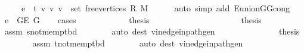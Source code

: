\begin{isabellebody}
\ \ \ \ {\isacharparenleft}{\kern0pt}{}{\isacharparenright}{\kern0pt}\ {\isachardoublequoteopen}e\ {\isasymin}\ {\isacharbraceleft}{\kern0pt}{\isacharbraceleft}{\kern0pt}t{\isacharcomma}{\kern0pt}\ v{\isacharbraceright}{\kern0pt}\ {\isacharbar}{\kern0pt}v{\isachardot}{\kern0pt}\ v\ {\isasymin}\ set\ {\isacharparenleft}{\kern0pt}free{\isacharunderscore}{\kern0pt}vertices\ R\ M{\isacharparenright}{\kern0pt}{\isacharbraceright}{\kern0pt}{\isachardoublequoteclose}\isanewline
\ \ \ \ \isamarkupfalse%
\ {\isacharparenleft}{\kern0pt}auto\ simp\ add{\isacharcolon}{\kern0pt}\ E{\isacharunderscore}{\kern0pt}union{\isacharunderscore}{\kern0pt}G{}{\isacharunderscore}{\kern0pt}G{}{\isacharunderscore}{\kern0pt}cong{\isacharparenright}{\kern0pt}\isanewline
\ \ \isamarkupfalse%
\ {\isachardoublequoteopen}e\ {\isasymin}\ G{\isachardot}{\kern0pt}E\ G{\isachardoublequoteclose}\isanewline
\ \ \isamarkupfalse%
\ {\isacharparenleft}{\kern0pt}cases{\isacharparenright}{\kern0pt}\isanewline
\ \ \ \ \isamarkupfalse%
\ {}\isanewline
\ \ \ \ \isamarkupfalse%
\ {\isacharquery}{\kern0pt}thesis\isanewline
\ \ \ \ \ \ \isacommand{{\isachardot}{\kern0pt}}\isamarkupfalse%
\isanewline
\ \ \isamarkupfalse%
\isanewline
\ \ \ \ \isamarkupfalse%
\ {}\isanewline
\ \ \ \ \isamarkupfalse%
\ {\isacharquery}{\kern0pt}thesis\isanewline
\ \ \ \ \ \ \isamarkupfalse%
\ assm\ s{\isacharunderscore}{\kern0pt}not{\isacharunderscore}{\kern0pt}mem{\isacharunderscore}{\kern0pt}p{\isacharunderscore}{\kern0pt}tbd\isanewline
\ \ \ \ \ \ \isamarkupfalse%
\ {\isacharparenleft}{\kern0pt}auto\ dest{\isacharcolon}{\kern0pt}\ v{\isacharunderscore}{\kern0pt}in{\isacharunderscore}{\kern0pt}edge{\isacharunderscore}{\kern0pt}in{\isacharunderscore}{\kern0pt}path{\isacharunderscore}{\kern0pt}gen{\isacharparenright}{\kern0pt}\isanewline
\ \ \isamarkupfalse%
\isanewline
\ \ \ \ \isamarkupfalse%
\ {}\isanewline
\ \ \ \ \isamarkupfalse%
\ {\isacharquery}{\kern0pt}thesis\isanewline
\ \ \ \ \ \ \isamarkupfalse%
\ assm\ t{\isacharunderscore}{\kern0pt}not{\isacharunderscore}{\kern0pt}mem{\isacharunderscore}{\kern0pt}p{\isacharunderscore}{\kern0pt}tbd\isanewline
\ \ \ \ \ \ \isamarkupfalse%
\ {\isacharparenleft}{\kern0pt}auto\ dest{\isacharcolon}{\kern0pt}\ v{\isacharunderscore}{\kern0pt}in{\isacharunderscore}{\kern0pt}edge{\isacharunderscore}{\kern0pt}in{\isacharunderscore}{\kern0pt}path{\isacharunderscore}{\kern0pt}gen{\isacharparenright}{\kern0pt}\isanewline

\end{isabellebody}
